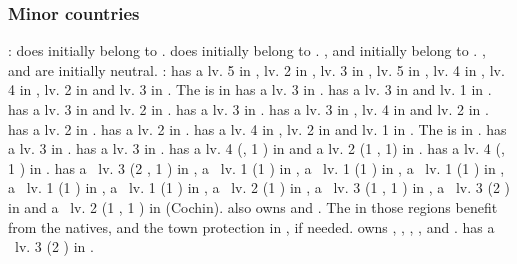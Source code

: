 \subsubsection{Minor countries}
\aparag[Provinces]:
\bparag \provinceTrentino does initially belong to \paysHabsbourg.
\bparag \provinceBresse does initially belong to \paysSavoie.
\bparag \provinceGotland, \provinceVastergotland and \provinceSkane initially
belong to \paysdanemark.
\bparag \provinceMontenegro, \provinceSerbia and \provinceBosna are initially
neutral.
:
\bparag \paysHollande has a \TradeFLEET lv. 5 in , lv. 2 in
, lv. 3 in , lv. 5 in , lv. 4 in
, lv. 4 in , lv. 2 in  and lv. 3 in
. The  is in \provinceVlaanderen
\bparag \paysecosse has a \TradeFLEET lv. 3 in .
\bparag \paysdanemark has a \TradeFLEET lv. 3 in  and lv. 1 in
.
\bparag \payshanse has a \TradeFLEET lv. 3 in  and lv. 2 in
.
\bparag \payssuede has a \TradeFLEET lv. 3 in .
\bparag \paysgenes has a \TradeFLEET lv. 3 in , lv. 4 in
 and lv. 2 in .
\bparag \paysoman has a \TradeFLEET lv. 2 in .
\bparag \paysaden has a \TradeFLEET lv. 2 in .
\bparag \paysgujarat has a \TradeFLEET lv. 4 in , lv. 2 in
 and lv. 1 in . The  is in \villeDiu.
\bparag \paysjapon has a \TradeFLEET lv. 3 in .
\bparag \payschine has a \TradeFLEET lv. 3 in .
\aparag[\ROTW]
\bparag \paysOman has a \COL lv. 4 (\constructionOman, 1 ) in
 and a \TP lv. 2 (1 , 1) in
\provinceZanzibar.
\bparag \paysAden has a \COL lv. 4 (\constructionAden, 1 ) in
.
\bparag \paysgujarat has a \TP\ lv. 3 (2 , 1 ) in
\provinceDiu, a \TP\ lv. 1 (1 ) in , a \TP\ lv. 1
(1 ) in , a \TP\ lv. 1 (1 ) in
, a \TP\ lv. 1 (1 ) in , a \TP\
lv. 1 (1 ) in \provinceOrmus, a \TP\ lv. 2 (1 ) in
\provinceMumbai, a \TP\ lv. 3 (1 , 1 ) in \provinceGoa, a
\TP\ lv. 3 (2 ) in \provinceKolikot and a \TP\ lv. 2 (1 \RES{PO},
1 \RES{Spices}) in \province{Malabar S} (Cochin).
\bparag \paysgujarat also owns \granderegionMalacca and
\granderegionGujarat. The \TP in those regions benefit from the natives, and
the town protection in \provinceDiu, if needed.
\bparag \paysvijayanagar owns \granderegionOrissa, \granderegionGondwana,
\granderegionKarnatika, \granderegionMalabar, \granderegionHyderabad and
\granderegionMumbai.
\bparag \paysSiberie has a \TP\ lv. 3 (2 ) in .


